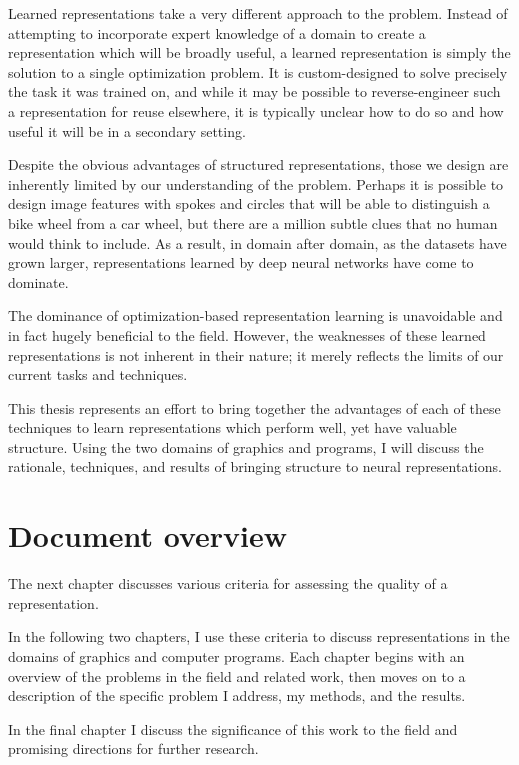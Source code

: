 \documentclass[12pt,twoside]{mitthesis}
\begin{document}
Learned representations take a very different approach to the problem.
Instead of attempting to incorporate expert knowledge of a domain to
create a representation which will be broadly useful, a learned
representation is simply the solution to a single optimization problem.
It is custom-designed to solve precisely the task it was trained on, and
while it may be possible to reverse-engineer such a representation for
reuse elsewhere, it is typically unclear how to do so and how useful it
will be in a secondary setting.

Despite the obvious advantages of structured representations, those we
design are inherently limited by our understanding of the problem.
Perhaps it is possible to design image features with spokes and circles
that will be able to distinguish a bike wheel from a car wheel, but
there are a million subtle clues that no human would think to include.
As a result, in domain after domain, as the datasets have grown larger,
representations learned by deep neural networks have come to dominate.

The dominance of optimization-based representation learning is
unavoidable and in fact hugely beneficial to the field. However, the
weaknesses of these learned representations is not inherent in their
nature; it merely reflects the limits of our current tasks and
techniques.

This thesis represents an effort to bring together the advantages of
each of these techniques to learn representations which perform well,
yet have valuable structure. Using the two domains of graphics and
programs, I will discuss the rationale, techniques, and results of
bringing structure to neural representations.

\section{Document overview}\label{document-overview}

The next chapter discusses various criteria for assessing the quality of
a representation.

In the following two chapters, I use these criteria to discuss
representations in the domains of graphics and computer programs. Each
chapter begins with an overview of the problems in the field and related
work, then moves on to a description of the specific problem I address,
my methods, and the results.

In the final chapter I discuss the significance of this work to the
field and promising directions for further research.
\end{document}
